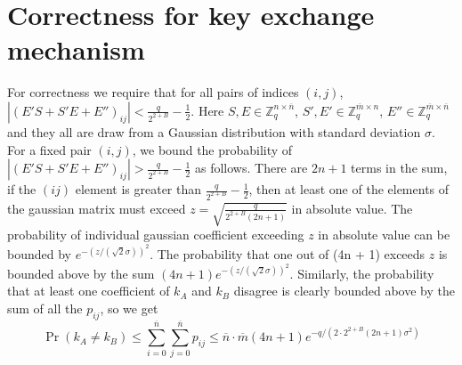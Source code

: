 \documentclass[12pt]{article}
\newcommand{\nbar}{\overline{n}}
\newcommand{\mbar}{\overline{m}}
\newcommand{\Z}{\mathbb{Z}}
\begin{document}
\section{Correctness for key exchange mechanism}
\label{sec:correctness}
For correctness we require that for all pairs of indices $(i, j)$, $|(E'S + S'E + E'')_{ij}| < \frac{q}{2^{2 + B}} - \frac{1}{2}$. Here $S,E \in \Z_q^{n \times \nbar}$, $S', E' \in \Z_q^{\mbar \times n}$, $E'' \in \Z_q^{\mbar \times \nbar}$ and they all are draw from a Gaussian distribution with standard deviation $\sigma$.
For a fixed pair $(i, j)$, we bound the probability of $|(E'S + S'E + E'')_{ij}| > \frac{q}{2^{2 + B}} - \frac{1}{2}$ as follows. There are $2n + 1$ terms in the sum, if the $(ij)$ element is greater than $\frac{q}{2^{2 + B}} - \frac{1}{2}$, then at least one of the elements of the gaussian matrix must exceed $z = \sqrt{\frac{q}{2^{2 + B} (2n + 1)}}$ in absolute value. The probability of individual gaussian coefficient exceeding $z$ in absolute value can be bounded by $e^{-(z / (\sqrt{2}\sigma))^2}$. The probability that one out of (4n + 1) exceeds $z$ is bounded above by the sum $(4n + 1)e^{-(z / (\sqrt{2}\sigma))^2}$. Similarly, the probability that at least one coefficient of $k_A$ and $k_B$ disagree is clearly bounded above by the sum of all the $p_{ij}$, so we get
\begin{equation}
\Pr(k_A \neq k_B) \leq \sum_{i = 0}^{\nbar} \sum_{j = 0}^{\nbar} p_{ij} \leq \nbar \cdot \mbar (4n + 1)e^{-q/ (2 \cdot 2^{2 + B} (2n + 1)\sigma^2)}
\label{eq:correctness_2_alternative}
\end{equation}
\end{document}
